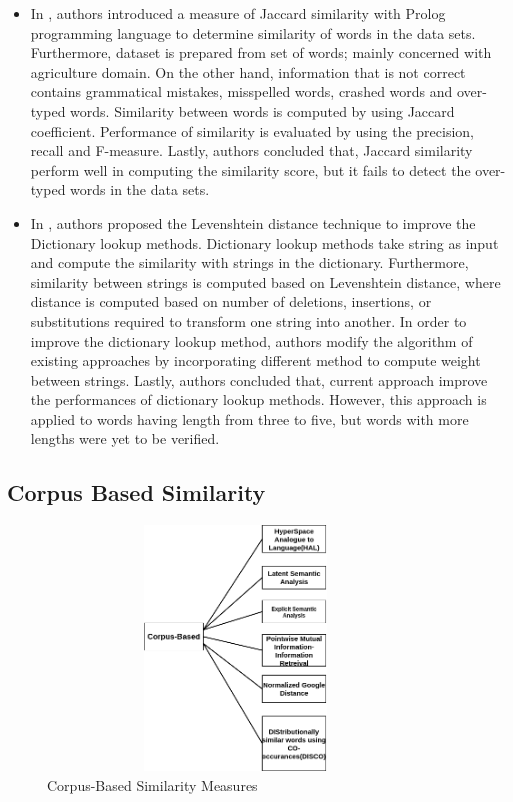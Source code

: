 \documentclass{article}
\begin{document}
\begin{itemize}
\item In \cite{jaccard}, authors introduced  a measure of Jaccard similarity with Prolog programming language to determine similarity of words in the data sets. Furthermore, dataset is prepared from set of words; mainly concerned with agriculture domain. On the other hand, information that is not correct contains grammatical mistakes, misspelled words, crashed words and over-typed words. Similarity between words is computed by using Jaccard coefficient. Performance of similarity is evaluated by using the precision, recall and F-measure. Lastly, authors concluded that, Jaccard similarity perform well in computing the similarity score, but it fails to detect the over-typed words in the data sets. 
\item In \cite{ldistance}, authors proposed the Levenshtein distance technique to improve the Dictionary lookup methods. Dictionary lookup methods take string as input and compute the similarity with strings in the dictionary. Furthermore, similarity between strings is computed based on Levenshtein distance, where distance is computed based on number of deletions, insertions, or substitutions required to transform one string into another. In order to improve the dictionary lookup method, authors modify the algorithm of existing approaches by incorporating different method to compute weight between strings. Lastly, authors concluded that, current approach improve the performances of dictionary lookup methods. However, this approach is applied to words having length from three to five, but words with more lengths were yet to be verified.  
\end{itemize}
\newpage
\begin{flushleft}
\subsection{Corpus Based Similarity}
\end{flushleft}
\begin{center}
\begin{figure}[h]
\includegraphics[width=10cm,height=6.5cm]{corpus_similarity.png}
\caption{Corpus-Based Similarity Measures\cite{survey}}
\end{figure}
\end{center}
\end{document}
